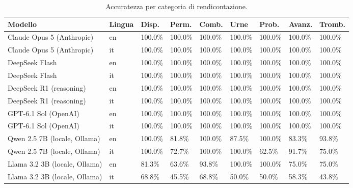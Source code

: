 \begin{table}[htbp]
\centering\small
\begin{tabularx}{\textwidth}{lXXXXXXXX}
\toprule
Modello & Lingua & Disp. & Perm. & Comb. & Urne & Prob. & Avanz. & Tromb. \\
\midrule
Claude Opus 5 (Anthropic) & en & 100.0\% & 100.0\% & 100.0\% & 100.0\% & 100.0\% & 100.0\% & 100.0\% \\
Claude Opus 5 (Anthropic) & it & 100.0\% & 100.0\% & 100.0\% & 100.0\% & 100.0\% & 100.0\% & 100.0\% \\
DeepSeek Flash & en & 100.0\% & 100.0\% & 100.0\% & 100.0\% & 100.0\% & 100.0\% & 100.0\% \\
DeepSeek Flash & it & 100.0\% & 100.0\% & 100.0\% & 100.0\% & 100.0\% & 100.0\% & 100.0\% \\
DeepSeek R1 (reasoning) & en & 100.0\% & 100.0\% & 100.0\% & 100.0\% & 100.0\% & 100.0\% & 100.0\% \\
DeepSeek R1 (reasoning) & it & 100.0\% & 100.0\% & 100.0\% & 100.0\% & 100.0\% & 100.0\% & 100.0\% \\
GPT-6.1 Sol (OpenAI) & en & 100.0\% & 100.0\% & 100.0\% & 100.0\% & 100.0\% & 100.0\% & 100.0\% \\
GPT-6.1 Sol (OpenAI) & it & 100.0\% & 100.0\% & 100.0\% & 100.0\% & 100.0\% & 100.0\% & 100.0\% \\
Qwen 2.5 7B (locale, Ollama) & en & 100.0\% & 81.8\% & 100.0\% & 87.5\% & 100.0\% & 83.3\% & 93.8\% \\
Qwen 2.5 7B (locale, Ollama) & it & 100.0\% & 72.7\% & 100.0\% & 100.0\% & 62.5\% & 91.7\% & 75.0\% \\
Llama 3.2 3B (locale, Ollama) & en & 81.3\% & 63.6\% & 93.8\% & 100.0\% & 100.0\% & 75.0\% & 75.0\% \\
Llama 3.2 3B (locale, Ollama) & it & 68.8\% & 45.5\% & 68.8\% & 50.0\% & 50.0\% & 58.3\% & 43.8\% \\
\bottomrule
\end{tabularx}
\caption{Accuratezza per categoria di rendicontazione.}
\label{tab:categorie}
\end{table}
